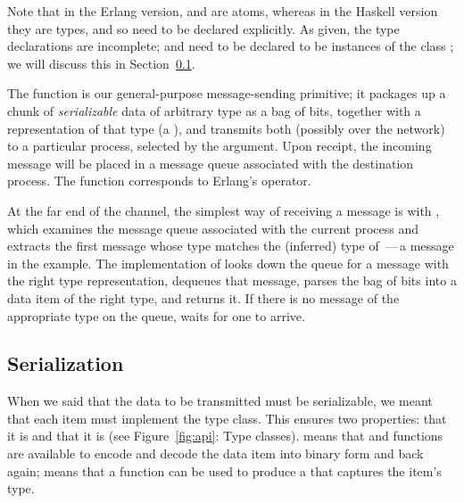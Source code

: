 \documentclass[preprint]{sigplanconf}
\begin{document}
Note that in the Erlang version,  and  are atoms, whereas in the Haskell version they are types, and so need to be declared explicitly. 
As given, the type declarations are incomplete;  and  need to be declared to be instances of the class ; we will discuss this in Section~\ref{s:serialization}.

The  function is our general-purpose message-sending primitive; it packages up a chunk of \emph{serializable} data of arbitrary type as a bag of bits, 
together with a representation of that type (a ), and transmits both (possibly over the network) to a particular process, selected by the  argument.
Upon receipt, the incoming message will be placed in a message queue associated with the destination process. 
The  function corresponds to Erlang's \textt{!} operator.

At the far end of the channel, the simplest way of receiving a message is with , which
examines the message queue associated with the current process and extracts the first message whose type matches the (inferred) type of \,---\,a  message in the example.  
The implementation of  looks down the queue for a message with the right type representation, 
dequeues that message, parses the bag of bits into a data item of the right type, and returns it.
If there is no message of the appropriate type on the queue,  waits for one to arrive.

\subsection{Serialization} 
\label{s:serialization}

When we said that the data to be transmitted must be serializable, we meant that each item must implement the  type class.  This ensures two properties: that it is  and that it is  (see Figure~\ref{fig:api}: Type classes).
 means that  and  functions are available to encode and decode the data item into binary form and back again;  means that a function  can be used to produce a  that captures the item's type.  
\end{document}
